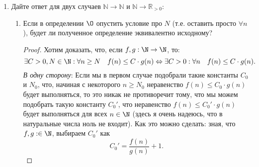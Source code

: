 \begin{enumerate}
\begin{proof}
  \end{proof}

  \item
    Дайте ответ для двух случаев $\mathbb{N} \to \mathbb{N}$ и $\mathbb{N} \to \mathbb{R}_{>0}$:
    \begin{enumerate}
      \item
        Если в определении $\O$ опустить условие про $N$ (т.е. оставить
        просто $\forall n$), будет ли полученное определение эквивалентно исходному?

      \begin{proof}
        Хотим доказать, что, если $f, g: \N \to \N$, то:
        \begin{equation}
          \exists C > 0, N \in \N: \forall n \geq N \quad f(n) \leq C \cdot g(n) \Leftrightarrow \exists C > 0: \forall n \quad f(n) \leq C \cdot g(n).
        \end{equation}
        \textit{В одну сторону}:
        Если мы в первом случае подобрали такие константы $C_0$ и $N_0$, что, начиная с некоторого $n \geq N_0$ неравенство $f(n) \leq C_0 \cdot g(n)$ будет выполняться, то это никак не противоречит тому, что мы можем подобрать такую константу $C_0'$, что неравенство $f(n) \leq C_0' \cdot g(n)$ будет выполняться для всех $n \in \N$ (здесь я очень надеюсь, что в натуральные числа ноль не входит). Как это можно сделать: зная, что $f, g: \in \N$, выбираем $C_0'$ как
        \begin{equation} \label{eq:c0'}
          C_0' = \frac{f(n)}{g(n)} + 1.
        \end{equation}


\end{proof}
\end{enumerate}
\end{enumerate}
